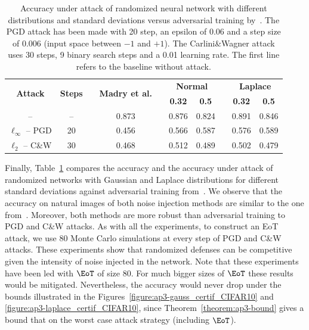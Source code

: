 \begin{table}[ht]
  \centering
  \begin{tabular}{cccccccccc}
    \toprule
    \multirow{2}{*}{\textbf{Attack}} & \multirow{2}{*}{\textbf{Steps}} & & \multirow{2}[0]{*}{\textbf{Madry et al.}} & &    \multicolumn{2}{c}{\textbf{Normal}} &  & \multicolumn{2}{c}{\textbf{Laplace}} \\
    \cmidrule{6-7} \cmidrule{9-10}
    & & & & & \textbf{0.32} & \textbf{0.5} &  & \textbf{0.32} & \textbf{0.5} \\
    \midrule
    --                    & -- & & 0.873 & & 0.876 & 0.824 & & 0.891 & 0.846 \\ 
    $\ell_\infty$ -- PGD  & 20 & & 0.456 & & 0.566 & 0.587 & & 0.576 & 0.589 \\
    $\ell_2$ -- C\&W      & 30 & & 0.468 & & 0.512 & 0.489 & & 0.502 & 0.479 \\
    \bottomrule
  \end{tabular}
  \caption{Accuracy under attack of randomized neural network with different distributions and standard deviations versus adversarial training by~\citet{madry2018towards}. The PGD attack has been made with 20 step, an epsilon of 0.06 and a step size of 0.006 (input space between $-1$ and $+1$). The Carlini\&Wagner attack uses 30 steps, 9 binary search steps and a 0.01 learning rate. The first line refers to the baseline without attack.}
  \label{table:madry_vs_random}
\end{table}

Finally, Table~\ref{table:madry_vs_random} compares the accuracy and the accuracy under attack of randomized networks with Gaussian and Laplace distributions for different standard deviations against adversarial training from~\citet{madry2018towards}.
We observe that the accuracy on natural images of both noise injection methods are similar to the one from~\citet{madry2018towards}.
Moreover, both methods are more robust than adversarial training to PGD and C\&W attacks.
As with all the experiments, to construct an EoT attack,  we use 80 Monte Carlo simulations at every step of PGD and C\&W attacks.
These experiments show that randomized defenses can be competitive given the intensity of noise injected in the network.
Note that these experiments have been led with $\EoT$ of size 80.
For much bigger sizes of $\EoT$ these results would be mitigated.
Nevertheless, the accuracy would never drop under the bounds illustrated in the Figures~\ref{figure:ap3-gauss_certif_CIFAR10} and \ref{figure:ap3-laplace_certif_CIFAR10}, since Theorem~\ref{theorem:ap3-bound} gives a bound that on the worst case attack strategy (including $\EoT$).


